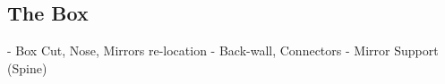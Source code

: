 \subsection{The Box}


- Box Cut, Nose, Mirrors re-location
- Back-wall, Connectors
- Mirror Support (Spine)




